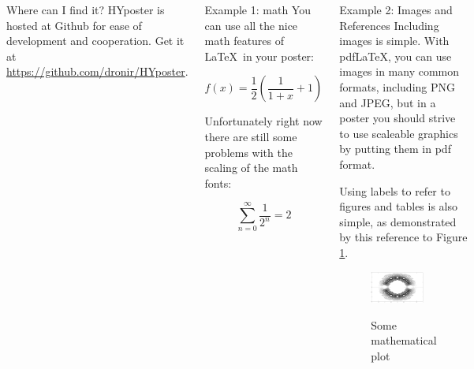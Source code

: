\documentclass[final]{beamer}
\begin{document}
\begin{frame}[t, fragile]
\begin{columns}[T]
\begin{block}{Where can I find it?}
HYposter is hosted at Github for ease of development and cooperation. Get it at \url{https://github.com/dronir/HYposter}.
\end{block}



\column{0.3\paperwidth}

\begin{block}{Example 1: math}
	You can use all the nice math features of \LaTeX~in your poster:

	\begin{equation}
		f(x) = \frac{1}{2}\left(\frac{1}{1+x} + 1\right)
	\end{equation}	

	Unfortunately right now there are still some problems with the scaling of the math fonts:

	\begin{equation}
		\sum_{n=0}^\infty \frac{1}{2^n} = 2
	\end{equation}
	


\end{block}
	
	
\begin{block}{Example 2: Images and References}
Including images is simple.  With pdf\LaTeX, you can use images in many common formats, including PNG and JPEG, but in a poster you should strive to use scaleable graphics by putting them in pdf format.
	
Using labels to refer to figures and tables is also simple, as demonstrated by this reference to Figure \ref{examplefigure}.

\begin{figure}
\includegraphics[width=0.8\textwidth]{zeros.png}
\label{examplefigure}
\caption{Some mathematical plot}
\end{figure}


\end{block}
\end{columns}
\end{frame}
\end{document}
